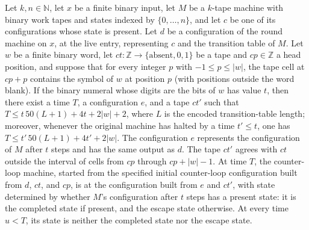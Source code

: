 \begin{theorem}
\label{Turing.StepBlock.loopTM_run}
\leanok
{}
Let $k,n\in\mathbb N$, let $x$ be a finite binary input, let $M$ be a $k$-tape machine
with binary work tapes and states indexed by $\{0,\ldots,n\}$, and let $c$ be one of its
configurations whose state is present. Let $d$ be a configuration of the round machine
on $x$, at the live entry, representing $c$ and the transition table of $M$. Let $w$ be
a finite binary word, let $ct:\mathbb Z\to\{\text{absent},0,1\}$ be a tape and
$cp\in\mathbb Z$ a head position, and suppose that for every integer $p$ with $-1\le
p\le |w|$, the tape cell at $cp+p$ contains the symbol of $w$ at position $p$ (with
positions outside the word blank). If the binary numeral whose digits are the bits of
$w$ has value $t$, then there exist a time $T$, a configuration $e$, and a tape $ct'$
such that $T\le t\,50(L+1)+4t+2|w|+2$, where $L$ is the encoded transition-table length;
moreover, whenever the original machine has halted by a time $t'\le t$, one has $T\le
t'\,50(L+1)+4t'+2|w|$. The configuration $e$ represents the configuration of $M$ after
$t$ steps and has the same output as $d$. The tape $ct'$ agrees with $ct$ outside the
interval of cells from $cp$ through $cp+|w|-1$. At time $T$, the counter-loop machine,
started from the specified initial counter-loop configuration built from $d$, $ct$, and
$cp$, is at the configuration built from $e$ and $ct'$, with state determined by whether
$M$'s configuration after $t$ steps has a present state: it is the completed state if
present, and the escape state otherwise. At every time $u<T$, its state is neither the
completed state nor the escape state.
\end{theorem}

